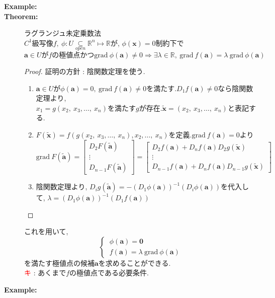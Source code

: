\documentclass[dvipdfmx]{jsarticle}
\newcommand{\point}{\textcircled{\textcolor{red}{\scriptsize キ}} }
\newcommand{\opensubset}{\underset{open}{\subseteq}}
\begin{document}
\begin{description}
    \item[\bf{Example:}]  
    \item[\bf{Theorem:}] ラグランジュ未定乗数法 \\
        $C^1$級写像$f,\ \phi : U \opensubset \mathbb{R}^n \mapsto \mathbb{R}$が, $\phi(\bm{x}) = 0$制約下で
        $$\bm{a} \in U \text{が} f \text{の極値点かつ}  \mathrm{grad} \ \phi(\bm{a}) \neq 0 \Rightarrow \exists \lambda \in \mathbb{R},\ \mathrm{grad} \ f(\bm{a}) = \lambda \ \mathrm{grad} \ \phi(\bm{a})$$
        \begin{proof} 証明の方針 : 陰関数定理を使う.
            \begin{enumerate}
                \item $\bm{a} \in U$が$\phi(\bm{a}) = 0,\ \mathrm{grad} \ f(\bm{a}) \neq 0$を満たす.$D_1 f(\bm{a}) \neq 0$なら陰関数定理より, \\
                $x_1 = g(x_2,\ x_3, \dots,\ x_n)$を満たす$g$が存在.$\tilde{\bm{x}} = ( x_2,\ x_3, \dots,\ x_n )$と表記する.
                \item $F(\tilde{\bm{x}}) = f(g(x_2,\ x_3, \dots,\ x_n), x_2, \dots,\ x_n)$を定義.$\mathrm{grad} \ f(\bm{a}) = 0$より \\
                $\mathrm{grad} \ F(\tilde{\bm{a}}) = \begin{bmatrix}
                    D_2 F(\tilde{\bm{a}}) \\
                    \vdots \\
                    D_{n-1} F(\tilde{\bm{a}}) 
                \end{bmatrix} = 
                \begin{bmatrix}
                    D_2 f(\bm{a}) + D_n f(\bm{a}) D_2g(\tilde{\bm{x}}) \\
                    \vdots \\
                    D_{n-1} f(\bm{a}) + D_n f(\bm{a}) D_{n-1}g(\tilde{\bm{x}})
                \end{bmatrix}
                $
                \item 陰関数定理より, $D_ig(\tilde{\bm{a}}) = -(D_1 \phi(\bm{a}))^{-1}(D_i \phi(\bm{a}))$を代入して, $\lambda = (D_1 \phi(\bm{a}))^{-1}(D_1 f(\bm{a}))$
            \end{enumerate}
        \end{proof}
        これを用いて, 
        $$ 
        \begin{cases} 
            \ \phi(\bm{a}) = \bm{0} \\
            \ f(\bm{a}) = \lambda \ \mathrm{grad} \ \phi(\bm{a})
        \end{cases}
        $$
        を満たす極値点の候補$\bm{a}$を求めることができる. \\
        \point : あくまで$f$の極値点である必要条件.
    \item[\bf{Example:}]
\end{description}
\end{document}
